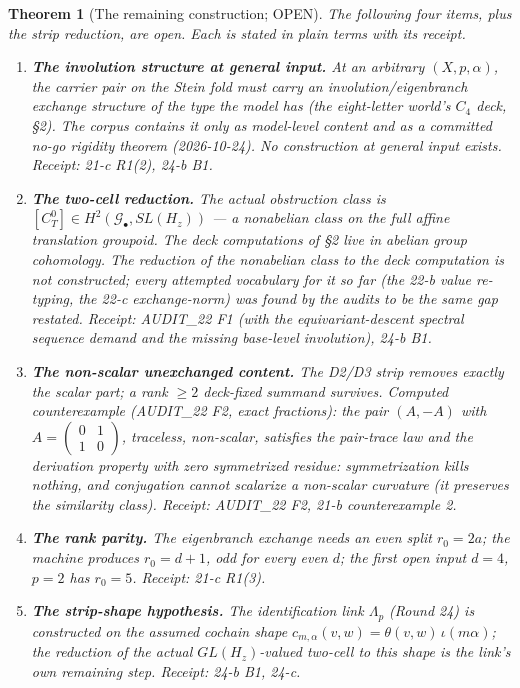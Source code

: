 \documentclass[11pt]{article}
\newtheorem{theorem}{Theorem}
\begin{document}
\begin{theorem}[The remaining construction; OPEN]
The following four items, plus the strip reduction, are open. Each is
stated in plain terms with its receipt.
\begin{enumerate}
\item[\textbf{(i)}] \textbf{The involution structure at general input.}
At an arbitrary $(X,p,\alpha)$, the carrier pair on the Stein fold
must carry an involution/eigenbranch exchange structure of the type
the model has (the eight-letter world's $C_4$ deck, \S2). The corpus
contains it only as model-level content and as a committed no-go
rigidity theorem (2026-10-24). No construction at general input
exists. Receipt: 21-c R1(2), 24-b B1.
\item[\textbf{(ii)}] \textbf{The two-cell reduction.} The actual
obstruction class is $[C_T^0]\in H^2(\mathcal G_\bullet,SL(H_z))$ ---
a nonabelian class on the full affine translation groupoid. The deck
computations of \S2 live in abelian group cohomology. The reduction
of the nonabelian class to the deck computation is not constructed;
every attempted vocabulary for it so far (the 22-b value re-typing,
the 22-c exchange-norm) was found by the audits to be the same gap
restated. Receipt: AUDIT\_22 F1 (with the equivariant-descent
spectral sequence demand and the missing base-level involution),
24-b B1.
\item[\textbf{(iii)}] \textbf{The non-scalar unexchanged content.} The
D2/D3 strip removes exactly the scalar part; a rank $\ge2$ deck-fixed
summand survives. Computed counterexample (AUDIT\_22 F2, exact
fractions): the pair $(A,-A)$ with $A=\left(\begin{smallmatrix}0&1\\
1&0\end{smallmatrix}\right)$, traceless, non-scalar, satisfies the
pair-trace law and the derivation property with \emph{zero}
symmetrized residue: symmetrization kills nothing, and conjugation
cannot scalarize a non-scalar curvature (it preserves the similarity
class). Receipt: AUDIT\_22 F2, 21-b counterexample 2.
\item[\textbf{(iv)}] \textbf{The rank parity.} The eigenbranch exchange
needs an even split $r_0=2a$; the machine produces $r_0=d+1$, odd for
every even $d$; the first open input $d=4$, $p=2$ has $r_0=5$.
Receipt: 21-c R1(3).
\item[\textbf{(v)}] \textbf{The strip-shape hypothesis.} The
identification link $\Lambda_p$ (Round 24) is constructed on the
assumed cochain shape
$c_{m,\alpha}(v,w)=\theta(v,w)\,\iota(m\alpha)$; the reduction of the
actual $GL(H_z)$-valued two-cell to this shape is the link's own
remaining step. Receipt: 24-b B1, 24-c.
\end{enumerate}
\end{theorem}
\end{document}
